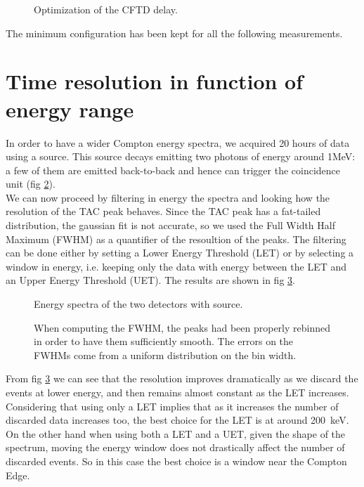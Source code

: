 \documentclass[11pt,a4 paper]{article}
\begin{document}
\begin{figure}[H]
    \centering
    \caption{Optimization of the CFTD delay.}
    \label{fig:CFTD:delay}
\end{figure}

The minimum configuration has been kept for all the following measurements.



\section{Time resolution in function of energy range}
In order to have a wider Compton energy spectra, we acquired 20 hours of data using a  source. This source decays emitting two photons of energy around 1\si{\mega\electronvolt}: a few of them are emitted back-to-back and hence can trigger the coincidence unit (fig \ref{fig:Co:spectra}).\\
We can now proceed by filtering in energy the spectra and looking how the resolution of the TAC peak behaves. Since the TAC peak has a fat-tailed distribution, the gaussian fit is not accurate, so we used the Full Width Half Maximum (FWHM) as a quantifier of the resoultion of the peaks.
The filtering can be done either by setting a Lower Energy Threshold (LET) or by selecting a window in energy, i.e. keeping only the data with energy between the LET and an Upper Energy Threshold (UET). The results are shown in fig \ref{fig:Co:results}.

\begin{figure}
    \centering
    \caption{Energy spectra of the two detectors with  source.}
    \label{fig:Co:spectra}
\end{figure}

\begin{figure}
    \centering
    \caption{When computing the FWHM, the peaks had been properly rebinned in order to have them sufficiently smooth. The errors on the FWHMs come from a uniform distribution on the bin width.}
    \label{fig:Co:results}
\end{figure}

From fig \ref{fig:Co:results} we can see that the resolution improves dramatically as we discard the events at lower energy, and then remains almost constant as the LET increases. Considering that using only a LET implies that as it increases the number of discarded data increases too, the best choice for the LET is at around \SI{200}{\kilo\electronvolt}. On the other hand when using both a LET and a UET, given the shape of the  spectrum, moving the energy window does not drastically affect the number of discarded events. So in this case the best choice is a window near the Compton Edge.
\end{document}
